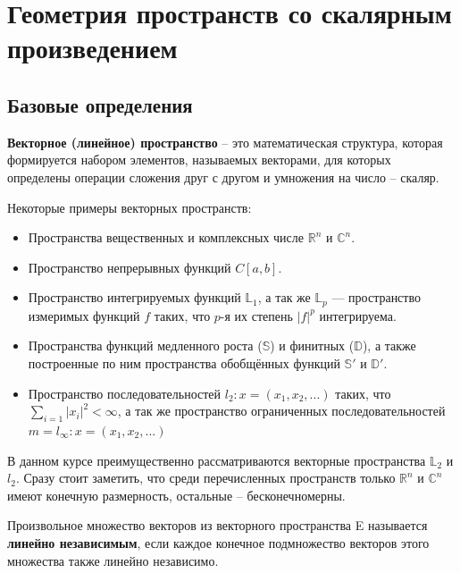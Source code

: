\documentclass[12pt]{article}
\begin{document}
\section{Геометрия пространств со скалярным произведением}


	\subsection{Базовые определения}

		\begin{defi} 
			\textbf{Векторное (линейное) пространство} -- это математическая структура, которая формируется набором
			элементов, называемых векторами, для которых определены операции сложения друг с другом и
			умножения на число -- скаляр.
		\end{defi}

		Некоторые примеры векторных пространств:
			\begin{itemize}
				\item Пространства вещественных и комплексных числе $\mathbb{R}^n$ и $\mathbb{C}^n$.
				\item Пространство непрерывных функций $C[a,b]$.
				\item Пространство интегрируемых функций $\mathbb{L}_1$, а так же $\mathbb{L}_p$ ---
				пространство измеримых функций $f$ таких, что $p$-я их степень $|f|^p$ интегрируема.
				\item Пространства функций медленного роста ($\mathbb{S}$) и финитных ($\mathbb{D}$), а также
				построенные по ним пространства обобщённых функций $\mathbb{S}'$ и $\mathbb{D}'$.
				\item Пространство последовательностей $l_2 : x = (x_1, x_2, ...)$ таких, что
				$\sum_{i=1} |x_i|^2 < \infty$, а так же пространство ограниченных последовательностей
				$m = l_\infty : x = (x_1, x_2, ...)$
			\end{itemize}

		В данном курсе преимущественно рассматриваются векторные пространства $\mathbb{L}_2$ и $l_2$. Сразу
		стоит заметить, что среди перечисленных пространств только $\mathbb{R}^n$ и $\mathbb{C}^n$ имеют
		конечную размерность, остальные -- бесконечномерны.
	
		\begin{defi}
			Произвольное множество векторов из векторного пространства E называется \textbf{линейно
			независимым}, если каждое конечное подмножество векторов этого множества также линейно
			независимо.
		\end{defi}
\end{document}
